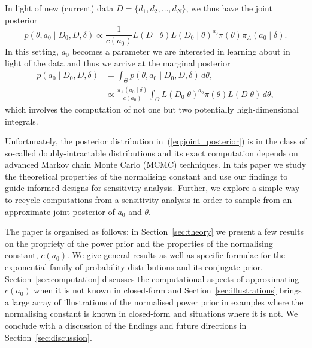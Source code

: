 \documentclass[a4paper, notitlepage, 11pt]{article}
\begin{document}
In light of new (current) data $D = \{d_1, d_2, \ldots, d_N\}$, we thus have the joint posterior
\begin{equation}
 \label{eq:joint_posterior}
 p(\theta, a_0 \mid D_0, D, \delta) \propto \frac{1}{c(a_0)} L(D \mid \theta) L(D_0 \mid \theta)^{a_0} \pi(\theta)\pi_A(a_0 \mid \delta).
\end{equation}
In this setting, $a_0$ becomes a parameter we are interested in learning about in light of the data and thus we arrive at the marginal posterior
\begin{align}
 \nonumber
   p(a_0 \mid D_0, D, \delta)  &= \int_{\Theta}  p(\theta, a_0 \mid D_0, D, \delta) \, d\theta,\\
  \label{eq:marginal_posterior_a0}
  & \propto \frac{\pi_A(a_0\mid \delta)}{c(a_0)} \int_{\Theta}  L(D_0| \theta)^{a_0} \pi(\theta) L(D | \theta) \, d\theta,
\end{align}
which involves the computation of not one but two potentially high-dimensional integrals.
% 

Unfortunately, the posterior distribution in~(\ref{eq:joint_posterior}) is in the class of so-called doubly-intractable distributions and its exact computation depends on advanced Markov chain Monte Carlo (MCMC) techniques.
In this paper we study the theoretical properties of the normalising constant
and use our findings to guide informed designs for sensitivity analysis.
Further, we explore a simple way to recycle computations from a sensitivity analysis in order to sample from an approximate joint posterior of $a_0$ and $\theta$.

The paper is organised as follows: in Section~\ref{sec:theory} we present a few results on the propriety of the power prior and the properties of the normalising constant, $c(a_0)$.
We give general results as well as specific formulae for the exponential family of probability distributions and its conjugate prior.
Section~\ref{sec:computation} discusses the computational aspects of approximating $c(a_0)$ when it is not known in closed-form and Section~\ref{sec:illustrations} brings a large array of illustrations of the normalised power prior in examples where the normalising constant is known in closed-form and situations where it is not.
We conclude with a discussion of the findings and future directions in Section~\ref{sec:discussion}.
\end{document}
